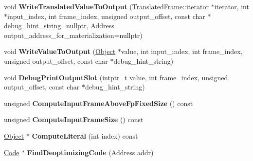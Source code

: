 \begin{DoxyCompactItemize}
\item 
void {\bfseries Write\+Translated\+Value\+To\+Output} (\hyperlink{classv8_1_1internal_1_1_translated_frame_1_1iterator}{Translated\+Frame\+::iterator} $\ast$iterator, int $\ast$input\+\_\+index, int frame\+\_\+index, unsigned output\+\_\+offset, const char $\ast$debug\+\_\+hint\+\_\+string=nullptr, Address output\+\_\+address\+\_\+for\+\_\+materialization=nullptr)\hypertarget{classv8_1_1internal_1_1_deoptimizer_ada32cd37929530d8fc390b43ddf5d6e9}{}\label{classv8_1_1internal_1_1_deoptimizer_ada32cd37929530d8fc390b43ddf5d6e9}

\item 
void {\bfseries Write\+Value\+To\+Output} (\hyperlink{classv8_1_1internal_1_1_object}{Object} $\ast$value, int input\+\_\+index, int frame\+\_\+index, unsigned output\+\_\+offset, const char $\ast$debug\+\_\+hint\+\_\+string)\hypertarget{classv8_1_1internal_1_1_deoptimizer_ac499728681017514f7d230286d78ad95}{}\label{classv8_1_1internal_1_1_deoptimizer_ac499728681017514f7d230286d78ad95}

\item 
void {\bfseries Debug\+Print\+Output\+Slot} (intptr\+\_\+t value, int frame\+\_\+index, unsigned output\+\_\+offset, const char $\ast$debug\+\_\+hint\+\_\+string)\hypertarget{classv8_1_1internal_1_1_deoptimizer_a7e30e5917d4bc5aaecd527da142a0b42}{}\label{classv8_1_1internal_1_1_deoptimizer_a7e30e5917d4bc5aaecd527da142a0b42}

\item 
unsigned {\bfseries Compute\+Input\+Frame\+Above\+Fp\+Fixed\+Size} () const \hypertarget{classv8_1_1internal_1_1_deoptimizer_a4b3ccbaa49a05b3c2cfcbde036b5df52}{}\label{classv8_1_1internal_1_1_deoptimizer_a4b3ccbaa49a05b3c2cfcbde036b5df52}

\item 
unsigned {\bfseries Compute\+Input\+Frame\+Size} () const \hypertarget{classv8_1_1internal_1_1_deoptimizer_a3a9abd89cd7befc92439b0b5a12cd8bf}{}\label{classv8_1_1internal_1_1_deoptimizer_a3a9abd89cd7befc92439b0b5a12cd8bf}

\item 
\hyperlink{classv8_1_1internal_1_1_object}{Object} $\ast$ {\bfseries Compute\+Literal} (int index) const \hypertarget{classv8_1_1internal_1_1_deoptimizer_a1e905f551f28fb78dcf67fcc3112609a}{}\label{classv8_1_1internal_1_1_deoptimizer_a1e905f551f28fb78dcf67fcc3112609a}

\item 
\hyperlink{classv8_1_1internal_1_1_code}{Code} $\ast$ {\bfseries Find\+Deoptimizing\+Code} (Address addr)\hypertarget{classv8_1_1internal_1_1_deoptimizer_a4cc4b5af0541effaeb4e0c85b932f80d}{}\label{classv8_1_1internal_1_1_deoptimizer_a4cc4b5af0541effaeb4e0c85b932f80d}


\end{DoxyCompactItemize}
